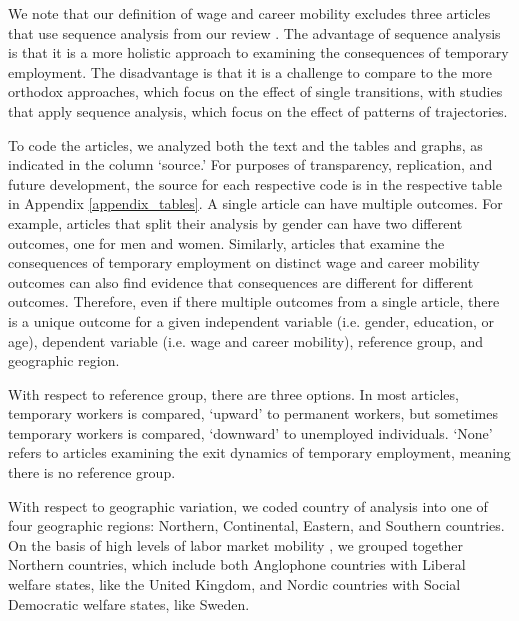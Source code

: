 \documentclass[12pt]{article}
\begin{document}
We note that our definition of wage and career mobility excludes three articles that use sequence analysis from our review \citep{mattijssen_pavlopoulos_2019,reichenberg_berglund_2019,fauser_2020}.  The advantage of sequence analysis is that it is a more holistic approach to examining the consequences of temporary employment.  The disadvantage is that it is a challenge to compare to the more orthodox approaches, which focus on the effect of single transitions, with studies that apply sequence analysis, which focus on the effect of patterns of trajectories.

To code the articles, we analyzed both the text and the tables and graphs, as indicated in the column `source.'  For purposes of transparency, replication, and future development, the source for each respective code is in the respective table in Appendix \ref{appendix_tables}.  A single article can have multiple outcomes.  For example, articles that split their analysis by gender can have two different outcomes, one for men and women.  Similarly, articles that examine the consequences of temporary employment on distinct wage and career mobility outcomes can also find evidence that consequences are different for different outcomes.  Therefore, even if there multiple outcomes from a single article, there is a unique outcome for a given independent variable (i.e. gender, education, or age), dependent variable (i.e. wage and career mobility), reference group, and geographic region.

With respect to reference group, there are three options.  In most articles, temporary workers is compared, `upward' to permanent workers, but sometimes temporary workers is compared, `downward' to unemployed individuals.  `None' refers to articles examining the exit dynamics of temporary employment, meaning there is no reference group.  

With respect to geographic variation, we coded country of analysis into one of four geographic regions: Northern, Continental, Eastern, and Southern countries.  On the basis of high levels of labor market mobility \citep{muffels_luijkx_2008}, we grouped together Northern countries, which include both Anglophone countries with Liberal welfare states, like the United Kingdom, and Nordic countries with Social Democratic welfare states, like Sweden.  
\end{document}
